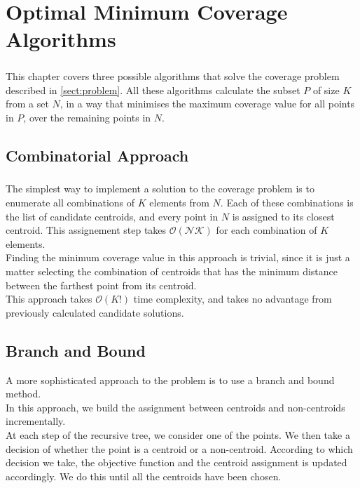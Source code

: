 \chapter{Optimal Minimum Coverage Algorithms}
\label{chap:algos}
\paragraph{}
This chapter covers three possible algorithms that solve the coverage problem described in \ref{sect:problem}. All these algorithms calculate the subset $P$ of size $K$ from a set $N$, in a way that minimises the maximum coverage value for all points in $P$, over the remaining points in $N$.

\section{Combinatorial Approach}
\paragraph{}
The simplest way to implement a solution to the coverage problem is to enumerate all combinations of $K$ elements from $N$. Each of these combinations is the list of candidate centroids, and every point in $N$ is assigned to its closest centroid. This assignement step takes $\mathcal{O(NK)}$ for each combination of $K$ elements.\\
Finding the minimum coverage value in this approach is trivial, since it is just a matter selecting the combination of centroids that has the minimum distance between the farthest point from its centroid. \\
This approach takes $\mathcal{O}(K!)$ time complexity, and takes no advantage from previously calculated candidate solutions.
\section{Branch and Bound}
\label{sect:bb}
A more sophisticated approach to the problem is to use a branch and bound method.\\
In this approach, we build the assignment between centroids and non-centroids incrementally.\\
At each step of the recursive tree, we consider one of the points. We then take a decision of whether the point is a centroid or a non-centroid. According to which decision we take, the objective function and the centroid assignment is updated accordingly. We do this until all the centroids have been chosen.
